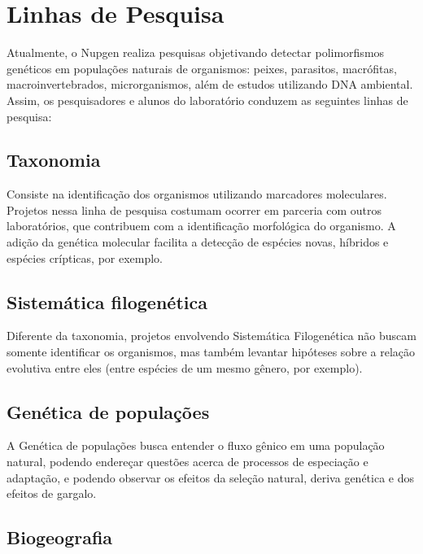 \documentclass[
  letterpaper,
  DIV=11,
  numbers=noendperiod]{scrreprt}
\begin{document}
\hypertarget{linhas-de-pesquisa}{%
\section{Linhas de Pesquisa}\label{linhas-de-pesquisa}}

Atualmente, o Nupgen realiza pesquisas objetivando detectar
polimorfismos genéticos em populações naturais de organismos: peixes,
parasitos, macrófitas, macroinvertebrados, microrganismos, além de
estudos utilizando DNA ambiental. Assim, os pesquisadores e alunos do
laboratório conduzem as seguintes linhas de pesquisa:

\hypertarget{taxonomia}{%
\subsection{Taxonomia}\label{taxonomia}}

Consiste na identificação dos organismos utilizando marcadores
moleculares. Projetos nessa linha de pesquisa costumam ocorrer em
parceria com outros laboratórios, que contribuem com a identificação
morfológica do organismo. A adição da genética molecular facilita a
detecção de espécies novas, híbridos e espécies crípticas, por exemplo.

\hypertarget{sistemuxe1tica-filogenuxe9tica}{%
\subsection{Sistemática
filogenética}\label{sistemuxe1tica-filogenuxe9tica}}

Diferente da taxonomia, projetos envolvendo Sistemática Filogenética não
buscam somente identificar os organismos, mas também levantar hipóteses
sobre a relação evolutiva entre eles (entre espécies de um mesmo gênero,
por exemplo).

\hypertarget{genuxe9tica-de-populauxe7uxf5es}{%
\subsection{Genética de
populações}\label{genuxe9tica-de-populauxe7uxf5es}}

A Genética de populações busca entender o fluxo gênico em uma população
natural, podendo endereçar questões acerca de processos de especiação e
adaptação, e podendo observar os efeitos da seleção natural, deriva
genética e dos efeitos de gargalo.

\hypertarget{biogeografia}{%
\subsection{Biogeografia}\label{biogeografia}}
\end{document}

